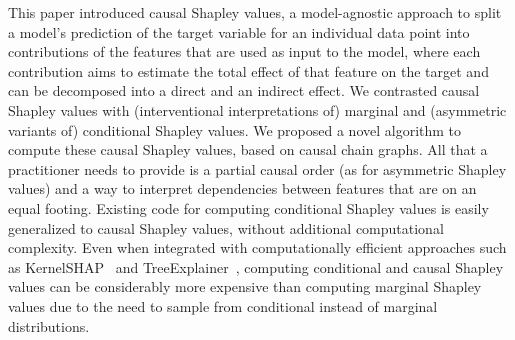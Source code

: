 \documentclass{article}
\newcommand{\comment}[1]{{\color{red} #1}}
\begin{document}
This paper introduced causal Shapley values, a model-agnostic approach to split a model's prediction of the target variable for an individual data point into contributions of the features that are used as input to the model, where each contribution aims to estimate the total effect of that feature on the target and can be decomposed into a direct and an indirect effect. We contrasted causal Shapley values with (interventional interpretations of) marginal and (asymmetric variants of) conditional Shapley values.
We proposed a novel algorithm to compute these causal Shapley values, based on causal chain graphs. All that a practitioner needs to provide is a partial causal order (as for asymmetric Shapley values) and a way to interpret dependencies between features that are on an equal footing.
Existing code for computing conditional Shapley values is easily generalized to causal Shapley values, without additional computational complexity. Even when integrated with computationally efficient approaches such as KernelSHAP~\cite{lundberg2017unified} and TreeExplainer~\cite{lundberg2020local}, computing conditional and causal Shapley values can be considerably more expensive than computing marginal Shapley values due to the need to sample from conditional instead of marginal distributions. 

\end{document}
